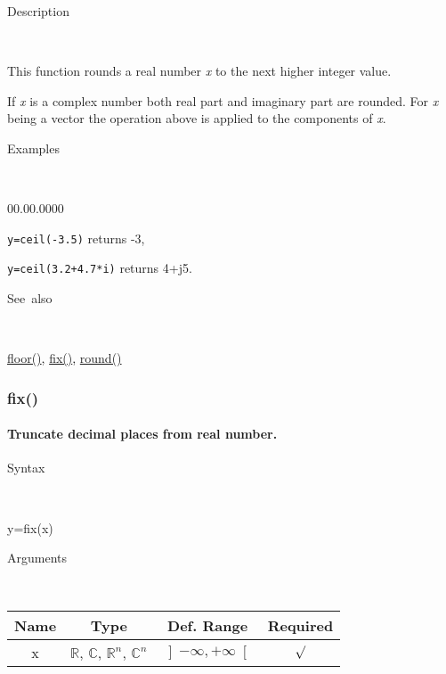 \begin{description}
\item [Description]~
\end{description}
This function rounds a real number \textit{x} to the next higher integer
value. 

If \textit{x} is a complex number both real part and imaginary part
are rounded. For \textit{x} being a vector the operation above is
applied to the components of \textit{x}.

\begin{description}
\item [Examples]~
\end{description}
\begin{lyxlist}{00.00.0000}
\item [\texttt{y=ceil(-3.5)}]returns -3,
\item [\texttt{y=ceil(3.2+4.7{*}i)}]returns 4+j5.
\end{lyxlist}
\begin{description}
\item [See~also]~
\end{description}
\textcolor{blue}{\hyperlink{floor}{floor()}}\textcolor{black}{,}
\textcolor{blue}{\hyperlink{fix}{fix()}}\textcolor{black}{,} \textcolor{blue}{\hyperlink{round}{round()}}


\newpage
\subsubsection*{\hypertarget{fix}{}{\Large fix()}}


\paragraph{\label{par:fix}Truncate decimal places from real number.}

\begin{description}
\item [Syntax]~
\end{description}
y=fix(x)

\begin{description}
\item [Arguments]~
\end{description}
\begin{tabular}{|c|c|c|c|}
\hline 
Name&
Type&
Def. Range&
Required\tabularnewline
\hline
\hline 
x&
$\mathbb{R}$, $\mathbb{C}$, $\mathbb{R}^{n}$, $\mathbb{C}^{n}$&
$\left]-\infty,+\infty\right[$&
$\surd$\tabularnewline
\hline
\end{tabular}


